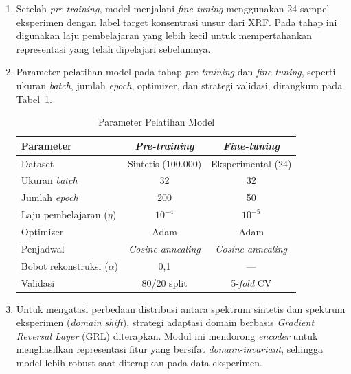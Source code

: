 \begin{enumerate}
\begin{equation} \label{eq:bab3_loss}
\mathcal{L} = \frac{1}{Z} \sum_{z=1}^{Z} \left(\hat{c}_z - c_z\right)^2 + \alpha \left\| S_{\mathrm{poly}} - \hat{S}_{\mathrm{poly}} \right\|^2
\end{equation}

    \item Setelah \textit{pre-training}, model menjalani \textit{fine-tuning} menggunakan 24 sampel eksperimen dengan label target konsentrasi unsur dari XRF. Pada tahap ini digunakan laju pembelajaran yang lebih kecil untuk mempertahankan representasi yang telah dipelajari sebelumnya.

    \item Parameter pelatihan model pada tahap \textit{pre-training} dan \textit{fine-tuning}, seperti ukuran \textit{batch}, jumlah \textit{epoch}, optimizer, dan strategi validasi, dirangkum pada Tabel~\ref{tab:param_pelatihan}.

\begin{table}[H]
  \centering
  \caption{Parameter Pelatihan Model}
  \label{tab:param_pelatihan}
  \small
  \begin{tabular}{|l|c|c|}
    \hline
    \textbf{Parameter} & \textbf{\textit{Pre-training}} & \textbf{\textit{Fine-tuning}} \\
    \hline
    Dataset & Sintetis (100.000) & Eksperimental (24) \\
    \hline
    Ukuran \textit{batch} & 32 & 32 \\
    \hline
    Jumlah \textit{epoch} & 200 & 50 \\
    \hline
    Laju pembelajaran ($\eta$) & $10^{-4}$ & $10^{-5}$ \\
    \hline
    Optimizer & Adam & Adam \\
    \hline
    Penjadwal & \textit{Cosine annealing} & \textit{Cosine annealing} \\
    \hline
    Bobot rekonstruksi ($\alpha$) & 0,1 & --- \\
    \hline
    Validasi & 80/20 split & 5-\textit{fold} CV \\
    \hline
  \end{tabular}
\end{table}
    \item Untuk mengatasi perbedaan distribusi antara spektrum sintetis dan spektrum eksperimen (\textit{domain shift}), strategi adaptasi domain berbasis \textit{Gradient Reversal Layer} (GRL) diterapkan. Modul ini mendorong \textit{encoder} untuk menghasilkan representasi fitur yang bersifat \textit{domain-invariant}, sehingga model lebih robust saat diterapkan pada data eksperimen.


\end{enumerate}
